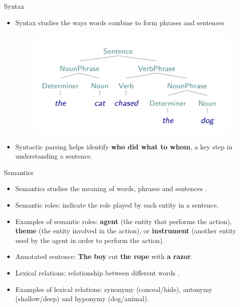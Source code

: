 \documentclass[handout]{beamer}
\begin{document}
\begin{frame}{Syntax}
\scriptsize{
\begin{itemize}
\item Syntax studies the ways words combine to form phrases and sentences \cite{JohnsonMLSS}
     \begin{figure}[h]
        	\includegraphics[scale = 0.3]{pics/parseTree1.png}
        \end{figure}
\item Syntactic parsing helps identify \textbf{who did what to whom}, a key step in
understanding a sentence.       
\end{itemize}

}


\end{frame}


\begin{frame}{Semantics}
\scriptsize{
\begin{itemize}
\item Semantics studies the meaning of words, phrases and sentences \cite{JohnsonMLSS}.
\item Semantic roles: indicate the role played by each entity in a sentence.
\item Examples of semantic roles: \textcolor[rgb]{0.00,0.00,1.00}{\textbf{agent}} (the entity that performs the action), \textcolor[rgb]{1.00,0.00,0.00}{\textbf{theme}} (the entity involved in the action), or \textcolor[rgb]{0.00,1.00,0.00}{\textbf{instrument}} (another entity used by the agent in order to perform the action).  
\item Annotated sentence: \textcolor[rgb]{0.00,0.00,1.00}{\textbf{The boy}}  cut \textcolor[rgb]{1.00,0.00,0.00}{\textbf{the rope}} with \textcolor[rgb]{0.00,1.00,0.00}{\textbf{a razor}}.
\item Lexical relations: relationship between different words \cite{yule2016study}.
\item Examples of lexical relations: synonymy (conceal/hide), antonymy (shallow/deep) and hyponymy (dog/animal).
\end{itemize}

}


\end{frame}
\end{document}
